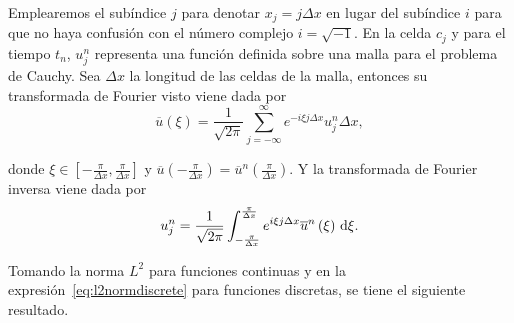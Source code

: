 \begin{frame}
    \frametitle{\secname}

    Emplearemos el subíndice $j$ para denotar
    $x_{j}=j\Delta x$ en lugar del subíndice $i$ para que no haya
    confusión con el número complejo $i=\sqrt{-1}$.
    En la celda $c_{j}$ y para el tiempo $t_{n}$, $u^{n}_{j}$ representa
    una función definida sobre una malla para el problema de Cauchy.
    Sea $\Delta x$ la longitud de las celdas de la malla,
    entonces su transformada de Fourier visto viene dada por
    \begin{equation}\label{eq:fouriertransform}
        \overline{u}
        \left(\xi\right)=
        \frac{1}{\sqrt{2\pi}}
        \sum_{j=-\infty}^{\infty}
        e^{-i\xi j\Delta x}
        u^{n}_{j}\Delta x,
    \end{equation}

    donde
    \begin{math}
        \xi\in
        \left[
            -\frac{\pi}{\Delta x},
            \frac{\pi}{\Delta x}
            \right]
    \end{math}
    y
    \begin{math}
        \overline{u}
        \left(
        -\frac{\pi}{\Delta x}
        \right)=
        \overline{u}^{n}
        \left(
        \frac{\pi}{\Delta x}
        \right)
    \end{math}.
    Y la transformada de Fourier inversa viene dada por
    \begin{equation}\label{eq:fourierinversetransform}
        u^{n}_{j}=
        \frac{1}{\sqrt{2\pi}}
        \int_{-\frac{\pi}{\Delta x}}^{\frac{\pi}{\Delta x}}
        e^{i\xi j\Delta x}
        \overline{u}^{n}
        \left(\xi\right)
        \dl\xi.
    \end{equation}

    Tomando la norma $L^{2}$ para funciones continuas y en la
    expresión~\eqref{eq:l2normdiscrete} para funciones discretas, se
    tiene el siguiente resultado.
\end{frame}

